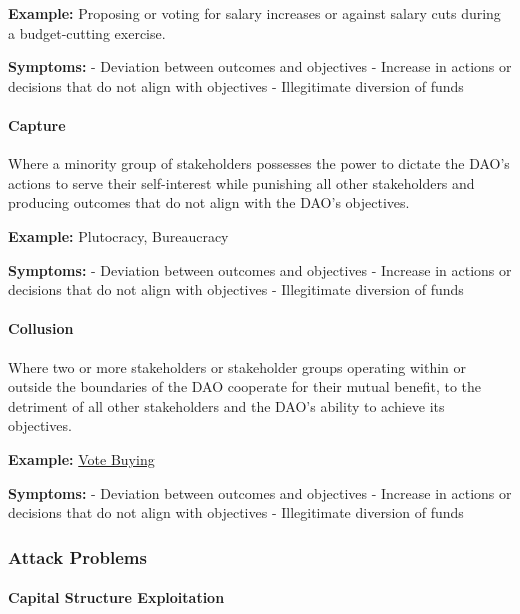 \documentclass[
]{article}
\begin{document}
\textbf{Example:} Proposing or voting for salary increases or against
salary cuts during a budget-cutting exercise.

\textbf{Symptoms:} - Deviation between outcomes and objectives -
Increase in actions or decisions that do not align with objectives -
Illegitimate diversion of funds

\hypertarget{capture}{%
\paragraph{Capture}\label{capture}}

Where a minority group of stakeholders possesses the power to dictate
the DAO's actions to serve their self-interest while punishing all other
stakeholders and producing outcomes that do not align with the DAO's
objectives.

\textbf{Example:} Plutocracy, Bureaucracy

\textbf{Symptoms:} - Deviation between outcomes and objectives -
Increase in actions or decisions that do not align with objectives -
Illegitimate diversion of funds

\hypertarget{collusion}{%
\paragraph{Collusion}\label{collusion}}

Where two or more stakeholders or stakeholder groups operating within or
outside the boundaries of the DAO cooperate for their mutual benefit, to
the detriment of all other stakeholders and the DAO's ability to achieve
its objectives.

\textbf{Example:}
\href{https://hackingdistributed.com/2018/07/02/on-chain-vote-buying/}{Vote
Buying}

\textbf{Symptoms:} - Deviation between outcomes and objectives -
Increase in actions or decisions that do not align with objectives -
Illegitimate diversion of funds

\hypertarget{attack-problems}{%
\subsubsection{Attack Problems}\label{attack-problems}}

\hypertarget{capital-structure-exploitation}{%
\paragraph{Capital Structure
Exploitation}\label{capital-structure-exploitation}}
\end{document}
